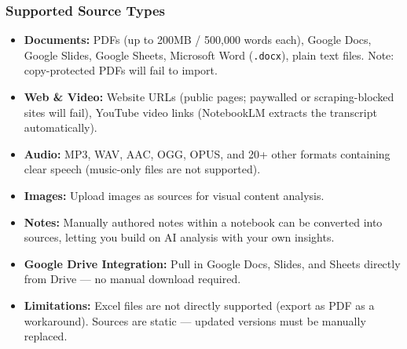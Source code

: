 \begin{frame}[fragile]\frametitle{Supported Source Types}
  \begin{itemize}
    \item \textbf{Documents:} PDFs (up to 200MB / 500,000 words each), Google Docs, Google Slides, Google Sheets, Microsoft Word (\texttt{.docx}), plain text files. Note: copy-protected PDFs will fail to import.
    \item \textbf{Web \& Video:} Website URLs (public pages; paywalled or scraping-blocked sites will fail), YouTube video links (NotebookLM extracts the transcript automatically).
    \item \textbf{Audio:} MP3, WAV, AAC, OGG, OPUS, and 20+ other formats containing clear speech (music-only files are not supported).
    \item \textbf{Images:} Upload images as sources for visual content analysis.
    \item \textbf{Notes:} Manually authored notes within a notebook can be converted into sources, letting you build on AI analysis with your own insights.
    \item \textbf{Google Drive Integration:} Pull in Google Docs, Slides, and Sheets directly from Drive — no manual download required.
    \item \textbf{Limitations:} Excel files are not directly supported (export as PDF as a workaround). Sources are static — updated versions must be manually replaced.
  \end{itemize}
\end{frame}

